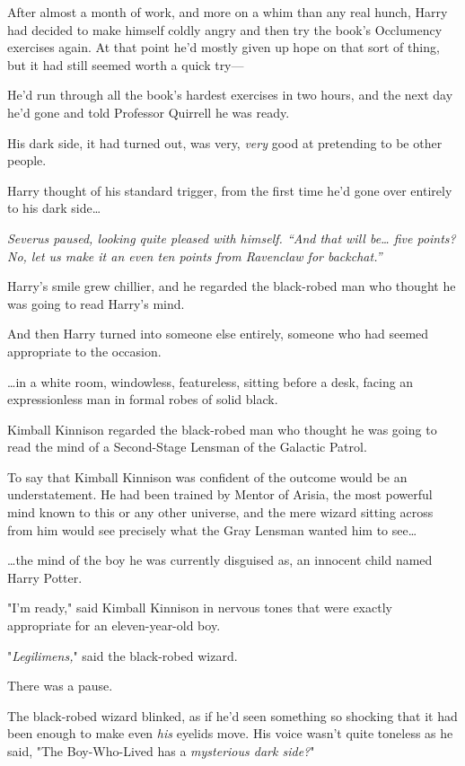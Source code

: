 After almost a month of work, and more on a whim than any real hunch, Harry had 
decided to make himself coldly angry and then try the book's Occlumency 
exercises again. At that point he'd mostly given up hope on that sort of thing, 
but it had still seemed worth a quick try---

He'd run through all the book's hardest exercises in two hours, and the next 
day he'd gone and told Professor Quirrell he was ready.

His dark side, it had turned out, was very, \emph{very} good at pretending to 
be other people.

Harry thought of his standard trigger, from the first time he'd gone over 
entirely to his dark side{\ldots}

\emph{Severus paused, looking quite pleased with himself. ``And that will 
be{\ldots} five points? No, let us make it an even ten points from Ravenclaw 
for backchat.''}

Harry's smile grew chillier, and he regarded the black-robed man who thought he 
was going to read Harry's mind.

And then Harry turned into someone else entirely, someone who had seemed 
appropriate to the occasion.

{\ldots}in a white room, windowless, featureless, sitting before a desk, facing 
an expressionless man in formal robes of solid black.

Kimball Kinnison regarded the black-robed man who thought he was going to read 
the mind of a Second-Stage Lensman of the Galactic Patrol.

To say that Kimball Kinnison was confident of the outcome would be an 
understatement. He had been trained by Mentor of Arisia, the most powerful mind 
known to this or any other universe, and the mere wizard sitting across from 
him would see precisely what the Gray Lensman wanted him to see{\ldots}

{\ldots}the mind of the boy he was currently disguised as, an innocent child 
named Harry Potter.

"I'm ready," said Kimball Kinnison in nervous tones that were exactly 
appropriate for an eleven-year-old boy.

"\emph{Legilimens,}" said the black-robed wizard.

There was a pause.

The black-robed wizard blinked, as if he'd seen something so shocking that it 
had been enough to make even \emph{his} eyelids move. His voice wasn't quite 
toneless as he said, "The Boy-Who-Lived has a \emph{mysterious dark side?}"

